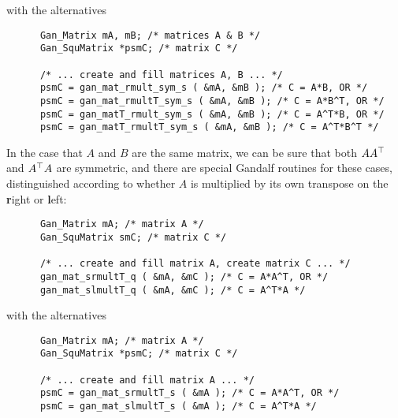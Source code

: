with the alternatives
\begin{verbatim}
      Gan_Matrix mA, mB; /* matrices A & B */
      Gan_SquMatrix *psmC; /* matrix C */

      /* ... create and fill matrices A, B ... */
      psmC = gan_mat_rmult_sym_s ( &mA, &mB ); /* C = A*B, OR */
      psmC = gan_mat_rmultT_sym_s ( &mA, &mB ); /* C = A*B^T, OR */
      psmC = gan_matT_rmult_sym_s ( &mA, &mB ); /* C = A^T*B, OR */
      psmC = gan_matT_rmultT_sym_s ( &mA, &mB ); /* C = A^T*B^T */
\end{verbatim}
In the case that $A$ and $B$ are the same matrix, we can be sure that both
$AA^{\top}$ and $A^{\top} A$ are symmetric, and there are special Gandalf routines
for these cases, distinguished according to whether $A$ is multiplied by its
own transpose on the {\bf r}ight or {\bf l}eft:
\begin{verbatim}
      Gan_Matrix mA; /* matrix A */
      Gan_SquMatrix smC; /* matrix C */

      /* ... create and fill matrix A, create matrix C ... */
      gan_mat_srmultT_q ( &mA, &mC ); /* C = A*A^T, OR */
      gan_mat_slmultT_q ( &mA, &mC ); /* C = A^T*A */
\end{verbatim}
with the alternatives
\begin{verbatim}
      Gan_Matrix mA; /* matrix A */
      Gan_SquMatrix *psmC; /* matrix C */

      /* ... create and fill matrix A ... */
      psmC = gan_mat_srmultT_s ( &mA ); /* C = A*A^T, OR */
      psmC = gan_mat_slmultT_s ( &mA ); /* C = A^T*A */
\end{verbatim}

